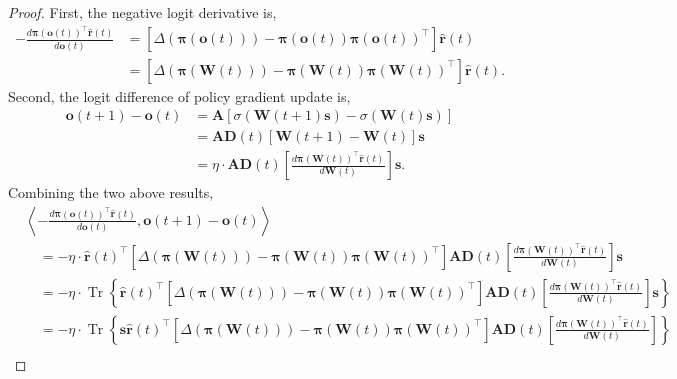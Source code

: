 \documentclass[10pt]{article}
\def\rvo{{\mathbf{o}}}
\def\rvr{{\mathbf{r}}}
\def\rvs{{\mathbf{s}}}
\def\rvo{{\mathbf{o}}}
\def\rvpi{{\boldsymbol{\pi}}}
\def\rmA{{\mathbf{A}}}
\def\rmD{{\mathbf{D}}}
\def\rmW{{\mathbf{W}}}
\DeclareMathOperator*{\trace}{Tr}
\begin{document}
\begin{proof}
    First, the negative logit derivative is,
\begin{equation*}
\begin{split}
    - \frac{d \rvpi\left( \rvo(t) \right)^\top \hat{\rvr}\left(t\right)}{d \rvo(t)} &= \left[\Delta\left( \rvpi\left( \rvo(t) \right) \right) - \rvpi\left( \rvo(t) \right) \rvpi\left( \rvo(t) \right)^\top \right] \hat{\rvr}\left(t\right) \\
    &= \left[\Delta\left( \rvpi\left( \rmW(t) \right) \right) - \rvpi\left( \rmW(t) \right) \rvpi\left( \rmW(t) \right)^\top \right] \hat{\rvr}\left(t\right).
\end{split}
\end{equation*}
Second, the logit difference of policy gradient update is,
\begin{equation*}
\begin{split}
    \rvo(t+1) - \rvo(t) &= \rmA \left[ \sigma\left(\rmW(t+1) \rvs \right) - \sigma\left( \rmW(t) \rvs \right)\right] \\
    &= \rmA \rmD(t) \left[ \rmW(t+1) - \rmW(t) \right] \rvs \\
    &= \eta \cdot \rmA \rmD(t) \left[ \frac{d \rvpi\left(\rmW(t)\right)^\top \hat{\rvr}\left(t\right)}{d \rmW(t)} \right] \rvs.
\end{split}
\end{equation*}
Combining the two above results,
\begin{equation*}
\begin{split}
    &\left\langle - \frac{d \rvpi\left( \rvo(t) \right)^\top \hat{\rvr}\left(t\right)}{d \rvo(t)}, \rvo(t+1) - \rvo(t) \right\rangle \\
    &\quad = - \eta \cdot \hat{\rvr}\left(t\right)^\top \left[\Delta\left( \rvpi\left( \rmW(t) \right) \right) - \rvpi\left( \rmW(t) \right) \rvpi\left( \rmW(t) \right)^\top \right] \rmA \rmD(t) \left[ \frac{d \rvpi\left(\rmW(t)\right)^\top \hat{\rvr}\left(t\right)}{d \rmW(t)} \right] \rvs \\
    &\quad = - \eta \cdot \trace \left\{ \hat{\rvr}\left(t\right)^\top \left[\Delta\left( \rvpi\left( \rmW(t) \right) \right) - \rvpi\left( \rmW(t) \right) \rvpi\left( \rmW(t) \right)^\top \right] \rmA \rmD(t) \left[ \frac{d \rvpi\left(\rmW(t)\right)^\top \hat{\rvr}\left(t\right)}{d \rmW(t)} \right] \rvs \right\} \\
    &\quad = - \eta \cdot \trace \left\{ \rvs \hat{\rvr}\left(t\right)^\top \left[\Delta\left( \rvpi\left( \rmW(t) \right) \right) - \rvpi\left( \rmW(t) \right) \rvpi\left( \rmW(t) \right)^\top \right] \rmA \rmD(t) \left[ \frac{d \rvpi\left(\rmW(t)\right)^\top \hat{\rvr}\left(t\right)}{d \rmW(t)} \right]  \right\} \\

\end{split}
\end{equation*}
\end{proof}
\end{document}
